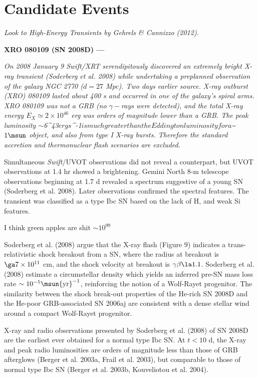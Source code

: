 \section{Candidate Events}\label{section:candidates}


{\em Look to High-Energy Transients by Gehrels \& Cannizzo (2012).  }


{\bf XRO 080109 (SN 2008D) ---} {\it On 2008 January 9 \emph{Swift}/XRT
serendipitously discovered an extremely bright X-ray transient
(Soderberg et al. 2008) while undertaking a preplanned observation
of the galaxy NGC 2770 ($d=27$ Mpc).  Two days earlier
source.  X-ray outburst (XRO) 080109 lasted about 400 s and occurred
in one of the galaxy's spiral arms.  XRO 080109 was not a GRB (no
$\gamma-$rays were detected), and the total X-ray energy $E_X \simeq
2\times 10^{46}$ erg was orders of magnitude lower than a GRB.  The
peak luminosity $\sim$6^{43}$ erg s$^{-1}$ is much greater
than the Eddington luminosity for a $\sim$1\msun$ object, and also
from type I X-ray bursts. Therefore the standard accretion and
thermonuclear flash scenarios are excluded.


Simultaneous \emph{Swift}/UVOT 
observations did not reveal a counterpart,
but UVOT observations at 1.4 hr showed a brightening.
Gemini North 8-m telescope 
observations beginning at 1.7 d 
revealed a spectrum   suggestive
of a young SN (Soderberg et al. 2008).
Later observations
confirmed the spectral features.
The transient was classified as
a type Ibc SN based on the lack of H, and weak Si features.


I think green apples are shit $\sim 10^{99}$


Soderberg et al. (2008) argue that the X-ray flash (Figure 9)
indicates a trans-relativistic shock breakout from a SN, where the
radius at breakout is $\ga7\times 10^{11}$ cm, and the shock velocity
at breakout is $\gamma\beta\la1.1$.  Soderberg et al. (2008) estimate
a circumstellar density which yields an inferred pre-SN mass loss
rate $\sim10^{-5}\msun {\rm yr}^{-1}$, reinforcing the notion of a Wolf-Rayet
progenitor.  The similarity between the shock break-out properties of
the He-rich SN 2008D and the He-poor GRB-associated SN 2006aj are
consistent with a dense stellar wind around a compact Wolf-Rayet
progenitor.


X-ray and radio observations presented by Soderberg et al. (2008) of
SN 2008D are the earliest ever obtained for a normal type Ibc SN.  At
$t < 10$ d, the X-ray and peak radio luminosities are orders of
magnitude less than those of GRB afterglows (Berger et al. 2003a,
Frail et al. 2003), but comparable to those of normal type Ibc SN
(Berger et al. 2003b, Kouveliotou et al. 2004).
}\\


